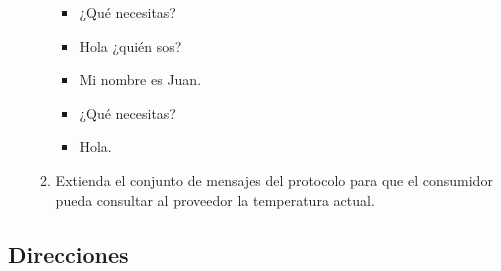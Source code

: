 \documentclass[12pt]{article}
\begin{document}
\begin{enumerate}
\begin{enumerate}
\begin{itemize}
            \item ¿Qué necesitas?

            \item Hola ¿quién sos?

            \item Mi nombre es Juan.

            \item ¿Qué necesitas?

            \item Hola.

        \end{itemize}

        \item Extienda el conjunto de mensajes del protocolo para que el
consumidor pueda consultar al proveedor la temperatura actual.

    \end{enumerate}

\end{enumerate}

\subsection*{Direcciones}
\end{document}
